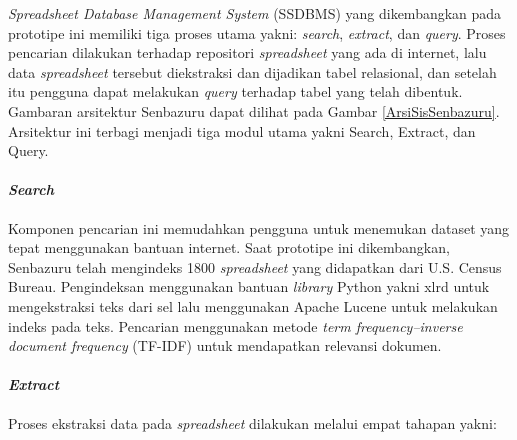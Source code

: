 \textit{Spreadsheet Database Management System} (SSDBMS) yang dikembangkan pada prototipe ini memiliki tiga proses utama yakni: \textit{search}, \textit{extract}, dan \textit{query}. Proses pencarian dilakukan terhadap repositori \textit{spreadsheet} yang ada di internet, lalu data \textit{spreadsheet} tersebut diekstraksi dan dijadikan tabel relasional, dan setelah itu pengguna dapat melakukan \textit{query} terhadap tabel yang telah dibentuk. Gambaran arsitektur Senbazuru dapat dilihat pada Gambar \ref{ArsiSisSenbazuru}. Arsitektur ini terbagi menjadi tiga modul utama yakni Search, Extract, dan Query.

\paragraph{\textit{Search}}
Komponen pencarian ini memudahkan pengguna untuk menemukan dataset yang tepat menggunakan bantuan internet. Saat prototipe ini dikembangkan, Senbazuru telah mengindeks 1800 \textit{spreadsheet} yang didapatkan dari U.S. Census Bureau. Pengindeksan menggunakan bantuan \textit{library} Python yakni xlrd untuk mengekstraksi teks dari sel lalu menggunakan Apache Lucene untuk melakukan indeks pada teks. Pencarian menggunakan metode \textit{term frequency–inverse document frequency} (TF-IDF) untuk mendapatkan relevansi dokumen.

\paragraph{\textit{Extract}}
Proses ekstraksi data pada \textit{spreadsheet} dilakukan melalui empat tahapan yakni:

